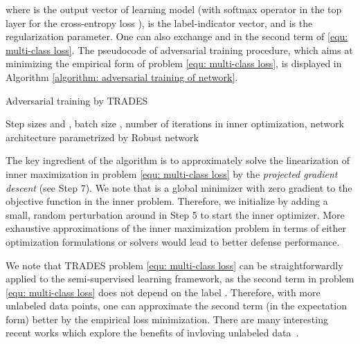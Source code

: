 \documentclass[11pt]{article}
\newcommand{\0}{\mathbf{0}}
\newcommand{\1}{\mathbf{1}}
\begin{document}
where  is the output vector of learning model (with softmax operator in the top layer for the cross-entropy loss ),  is the label-indicator vector, and  is the regularization parameter. One can also exchange  and  in the second term of \eqref{equ: multi-class loss}. The pseudocode of adversarial training procedure, which aims at minimizing the empirical form of problem \eqref{equ: multi-class loss}, is displayed in Algorithm \ref{algorithm: adversarial training of network}.

\begin{algorithm}[t]
\caption{Adversarial training by TRADES}
\label{algorithm: adversarial training of network}
\begin{algorithmic}[1]
 Step sizes  and , batch size , number of iterations  in inner optimization, network architecture parametrized by 
 Robust network 
\REPEAT
{}
\FOR{}
\ENDFOR
\ENDFOR
\STATE{}
\end{algorithmic}
\end{algorithm}

The key ingredient of the algorithm is to approximately solve the linearization of inner maximization in problem \eqref{equ: multi-class loss} by the \emph{projected gradient descent} (see Step 7). We note that  is a global minimizer with zero gradient to the objective function  in the inner problem. Therefore, we initialize  by adding a small, random perturbation around  in Step 5 to start the inner optimizer. More exhaustive approximations of the inner maximization problem in terms of either optimization formulations or solvers would lead to better defense performance.


\medskip
{}
We note that TRADES problem \eqref{equ: multi-class loss} can be straightforwardly applied to the semi-supervised learning framework, as the second term in problem \eqref{equ: multi-class loss} does not depend on the label . Therefore, with more unlabeled data points, one can approximate the second term (in the expectation form) better by the empirical loss minimization. There are many interesting recent works which explore the benefits of invloving unlabeled data~\cite{carmon2019unlabeled,stanforth2019labels,zhai2019adversarially}.
\end{document}
